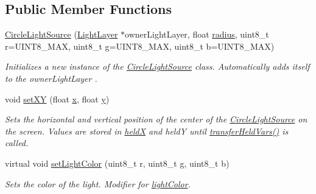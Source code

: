 \subsection*{Public Member Functions}
\begin{DoxyCompactItemize}
\item 
\hyperlink{classlighting_1_1CircleLightSource_ade3ca945a040132851a26bef3c22fe6e}{Circle\+Light\+Source} (\hyperlink{classlighting_1_1LightLayer}{Light\+Layer} $\ast$owner\+Light\+Layer, float \hyperlink{classlighting_1_1CircleLightSource_a4da9b32f524563c2faeba5ea81dfe6fb}{radius}, uint8\+\_\+t r=U\+I\+N\+T8\+\_\+\+M\+AX, uint8\+\_\+t g=U\+I\+N\+T8\+\_\+\+M\+AX, uint8\+\_\+t b=U\+I\+N\+T8\+\_\+\+M\+AX)
\begin{DoxyCompactList}\small\item\em Initializes a new instance of the \hyperlink{classlighting_1_1CircleLightSource}{Circle\+Light\+Source} class. Automatically adds itself to the {\itshape owner\+Light\+Layer} . \end{DoxyCompactList}\item 
void \hyperlink{classlighting_1_1CircleLightSource_ae035f07aeb1e540c6066a4ff82bf4b54}{set\+XY} (float \hyperlink{classlighting_1_1CircleLightSource_afd27de5d967e2a308dadeff29d3c2883}{x}, float \hyperlink{classlighting_1_1CircleLightSource_ac05186b92c9bdfcef8a27cc89f8c9b52}{y})
\begin{DoxyCompactList}\small\item\em Sets the horizontal and vertical position of the center of the \hyperlink{classlighting_1_1CircleLightSource}{Circle\+Light\+Source} on the screen. Values are stored in \hyperlink{classlighting_1_1CircleLightSource_aa008d846fd893f0ff40e5994af4d487e}{heldX} and heldY until \hyperlink{classlighting_1_1CircleLightSource_afc39570a33c19b17fb8153be592b01e9}{transfer\+Held\+Vars()} is called. \end{DoxyCompactList}\item 
virtual void \hyperlink{classlighting_1_1CircleLightSource_a8ca70332ba3b1926e6c65a56cb30416c}{set\+Light\+Color} (uint8\+\_\+t r, uint8\+\_\+t g, uint8\+\_\+t b)
\begin{DoxyCompactList}\small\item\em Sets the color of the light. Modifier for \hyperlink{classlighting_1_1CircleLightSource_a39d1b9f5bfb54facf6a7e36ed0ffda82}{light\+Color}. \end{DoxyCompactList}\end{DoxyCompactItemize}
